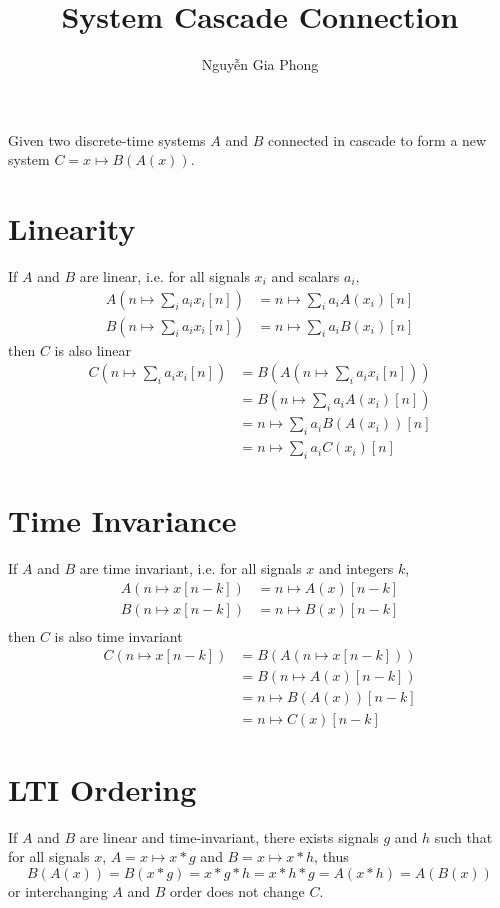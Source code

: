 \documentclass[a4paper,12pt]{article}
\title{System Cascade Connection}
\author{{\selectlanguage{vietnamese}Nguyễn Gia Phong}}
\begin{document}
\maketitle
Given two discrete-time systems $A$ and $B$ connected in cascade to form
a new system $C = x \mapsto B(A(x))$.

\section{Linearity}
If $A$ and $B$ are linear, i.e. for all signals $x_i$ and scalars $a_i$,
\begin{align*}
  A\left(n \mapsto \sum_i a_i x_i[n]\right) &= n \mapsto \sum_i a_i A(x_i)[n]\\
  B\left(n \mapsto \sum_i a_i x_i[n]\right) &= n \mapsto \sum_i a_i B(x_i)[n]
\end{align*}
then $C$ is also linear
\begin{align*}
  C\left(n \mapsto \sum_i a_i x_i[n]\right)
  &= B\left(A\left(n \mapsto \sum_i a_i x_i[n]\right)\right)\\
  &= B\left(n \mapsto \sum_i a_i A(x_i)[n]\right)\\
  &= n \mapsto \sum_i a_i B(A(x_i))[n]\\
  &= n \mapsto \sum_i a_i C(x_i)[n]
\end{align*}

\section{Time Invariance}
If $A$ and $B$ are time invariant, i.e. for all signals $x$ and integers $k$,
\begin{align*}
  A(n \mapsto x[n - k]) &= n \mapsto A(x)[n - k]\\
  B(n \mapsto x[n - k]) &= n \mapsto B(x)[n - k]\\
\end{align*}
then $C$ is also time invariant
\begin{align*}
  C(n \mapsto x[n - k])
  &= B(A(n \mapsto x[n - k]))\\
  &= B(n \mapsto A(x)[n - k])\\
  &= n \mapsto B(A(x))[n - k]\\
  &= n \mapsto C(x)[n - k]
\end{align*}

\section{LTI Ordering}
If $A$ and $B$ are linear and time-invariant, there exists signals $g$ and $h$
such that for all signals $x$, $A = x \mapsto x * g$ and $B = x \mapsto x * h$,
thus \[B(A(x)) = B(x * g) = x * g * h = x * h * g = A(x * h) = A(B(x))\]
or interchanging $A$ and $B$ order does not change $C$.
\end{document}
